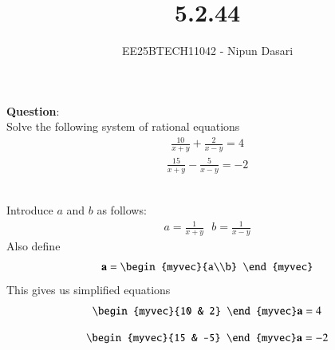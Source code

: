 \documentclass[journal]{IEEEtran}
\begin{document}
	
	
	\vspace{3cm}
	
	\title{5.2.44}
	\author{EE25BTECH11042 - Nipun Dasari}
	\maketitle
	
	\renewcommand{\thefigure}{\theenumi}
	\renewcommand{\thetable}{\theenumi}
	\setlength{\intextsep}{10pt} %
	
	
	\renewcommand{\thetable}{\theenumi}
	
	\textbf{Question}:\\
	Solve the following system of rational equations
	\begin{align}
		\frac{10}{x+y}+\frac{2}{x-y} = 4
	\end{align}
	\begin{align}
		\frac{15}{x+y}-\frac{5}{x-y} = -2
	\end{align}
	
	
	\solution \\
	Introduce $a$ and $b$ as follows:
	\begin{align}
		a = \frac{1}{x+y} \text{  } b = \frac{1}{x-y}
	\end{align}
	Also define
	\begin{align}
		\vec{a} = \begin{myvec}{a\\b} \end{myvec}
	\end{align}
	This gives us simplified equations
	\begin{align}
		\begin{myvec}{10 & 2} \end{myvec}\vec{a} = 4
	\end{align}
	
	\begin{align}
		\begin{myvec}{15 & -5} \end{myvec}\vec{a} = -2
	\end{align}
	
\end{document}
